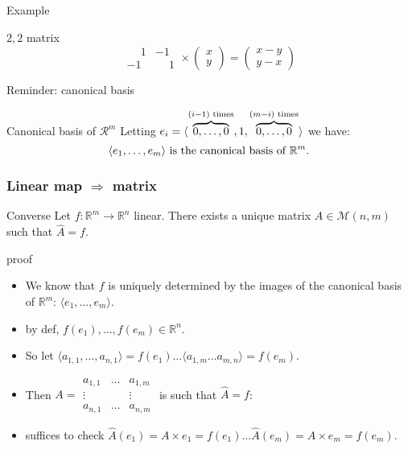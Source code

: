 \documentclass{beamer}
\begin{document}
\begin{frame}{Example}
  \begin{exampleblock}{$2,2$ matrix}
    \[ \begin{array}{|cc|}
      \phantom{-}1 &  -1 \\
      -1 & \phantom{-}1 
    \end{array} \times \left ( \begin{array}{c} x \\ y \end{array} \right ) = \left ( \begin{array}{c} x - y \\ y - x \end{array} \right )  
    \]
  \end{exampleblock}
\end{frame}

\begin{frame}{Reminder: canonical basis}
  \begin{block}{Canonical basis of $\mathcal{R}^m$}
    Letting $e_i = \langle \overbrace{0,\dots,0}^{(i-1) \textnormal{ times}}, 1, \overbrace{0,\dots,0}^{(m-i) \textnormal{ times}} \rangle$ we have: \[\langle e_1, \dots, e_m \rangle \textnormal{ is the canonical basis of } \mathbb{R}^m.\]
  \end{block}
\end{frame}

\begin{frame}
  \frametitle{Linear map $\Rightarrow$ matrix}
  \begin{block}{Converse}
    Let $f : \mathbb{R}^m \rightarrow \mathbb{R}^n$ linear. There exists a unique matrix $A \in \mathcal{M}(n,m)$ such that $\hat A = f$.
  \end{block}

  \begin{block}{proof}
    \begin{itemize}
    \item We know that $f$ is uniquely determined by the images of the canonical basis of $\mathbb{R}^m$: $\langle e_1, \dots, e_m \rangle$.
    \item by def, $f(e_1), \dots, f(e_m) \in \mathbb{R}^n$.
    \item So let $\langle a_{1,1}, \dots, a_{n,1} \rangle = f(e_1) \dots \langle a_{1, m} \dots a_{m, n} \rangle = f(e_m)$.
    \item Then $A = \begin{array}{|ccc|} a_{1,1} & \dots & a_{1,m}\\ \vdots & & \vdots\\ a_{n,1} & \dots & a_{n, m} \end{array}$ is such that $\hat A = f$:
    \item suffices to check $\hat A(e_1) = A \times e_1 = f(e_1) \dots \hat A(e_m) = A \times e_m = f(e_m)$.
    \end{itemize}
  \end{block}
  
\end{frame}
\end{document}
